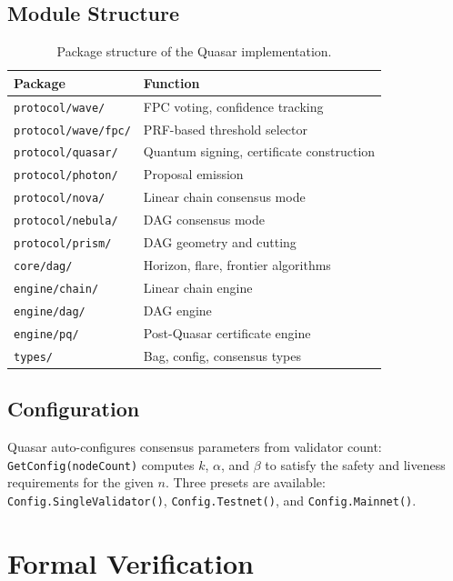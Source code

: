 \documentclass[11pt,a4paper]{article}
\begin{document}
\subsection{Module Structure}

\begin{table}[ht]
\centering
\small
\begin{tabular}{@{}ll@{}}
\toprule
\textbf{Package} & \textbf{Function} \\
\midrule
\texttt{protocol/wave/}   & FPC voting, confidence tracking \\
\texttt{protocol/wave/fpc/} & PRF-based threshold selector \\
\texttt{protocol/quasar/} & Quantum signing, certificate construction \\
\texttt{protocol/photon/} & Proposal emission \\
\texttt{protocol/nova/}   & Linear chain consensus mode \\
\texttt{protocol/nebula/} & DAG consensus mode \\
\texttt{protocol/prism/}  & DAG geometry and cutting \\
\texttt{core/dag/}        & Horizon, flare, frontier algorithms \\
\texttt{engine/chain/}    & Linear chain engine \\
\texttt{engine/dag/}      & DAG engine \\
\texttt{engine/pq/}       & Post-Quasar certificate engine \\
\texttt{types/}           & Bag, config, consensus types \\
\bottomrule
\end{tabular}
\caption{Package structure of the Quasar implementation.}
\label{tab:packages}
\end{table}

\subsection{Configuration}

Quasar auto-configures consensus parameters from validator count:
\texttt{GetConfig(nodeCount)} computes $k$, $\alpha$, and $\beta$ to
satisfy the safety and liveness requirements for the given $n$. Three
presets are available: \texttt{Config.SingleValidator()},
\texttt{Config.Testnet()}, and \texttt{Config.Mainnet()}.


\section{Formal Verification}
\label{sec:formal}
\end{document}
